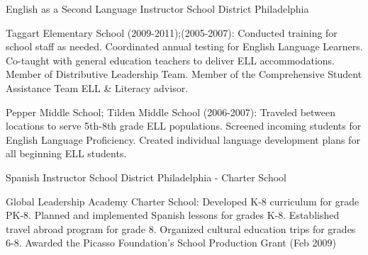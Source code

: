 \documentclass[]{scrartcl}
\begin{document}
\begin{cleanCV}
\newpage

{English as a Second Language Instructor}
{School District Philadelphia}

\JobDesc
{Taggart Elementary School (2009-2011);(2005-2007): }
{Conducted training for school staff as needed. Coordinated annual testing for English Language Learners. Co-taught with general education teachers to deliver ELL accommodations. Member of Distributive Leadership Team. Member of the Comprehensive Student Assistance Team ELL \& Literacy advisor.}

\JobDesc
{Pepper Middle School; Tilden Middle School (2006-2007): }
{Traveled between locations to serve 5th-8th grade ELL populations. 
Screened incoming students for English Language Proficiency.
Created individual language development plans for all beginning ELL students.}

  
{Spanish Instructor}
{School District Philadelphia - Charter School}

\JobDesc
{Global Leadership Academy Charter School: }
{Developed K-8 curriculum for grade PK-8.
Planned and implemented Spanish lessons for grades K-8.
Established travel abroad program for grade 8.
Organized cultural education trips for grades 6-8. 
Awarded the Picasso Foundation's School Production Grant (Feb 2009)}






\vspace{2.2em}


\newcommand{\DCPS}{District of Columbia Public Schools}

\newcommand{\DCOR}
{District of Columbia Public Schools\\
Office Professional Development: Coaches Institute}


\end{cleanCV}
\end{document}
